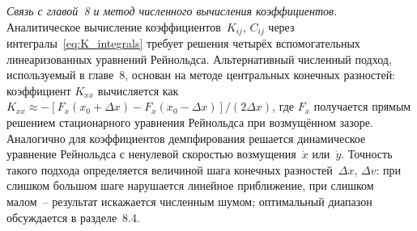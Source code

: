 \textit{Связь с главой~8 и метод численного вычисления
коэффициентов.}
Аналитическое вычисление коэффициентов~$K_{ij}$, $C_{ij}$
через интегралы~\eqref{eq:K_integrals} требует решения
четырёх вспомогательных линеаризованных уравнений Рейнольдса.
Альтернативный численный подход, используемый в главе~8,
основан на методе центральных конечных разностей:
коэффициент $K_{xx}$ вычисляется как
$K_{xx} \approx -[F_x(x_0 + \Delta x) -
F_x(x_0 - \Delta x)]/(2\Delta x)$, где $F_x$ получается
прямым решением стационарного уравнения Рейнольдса при
возмущённом зазоре. Аналогично для коэффициентов демпфирования
решается динамическое уравнение Рейнольдса с ненулевой
скоростью возмущения~$\dot{x}$ или~$\dot{y}$. Точность
такого подхода определяется величиной шага конечных
разностей~$\Delta x$, $\Delta v$: при слишком большом шаге
нарушается линейное приближение, при слишком малом~-- результат
искажается численным шумом; оптимальный диапазон обсуждается
в разделе~8.4.
